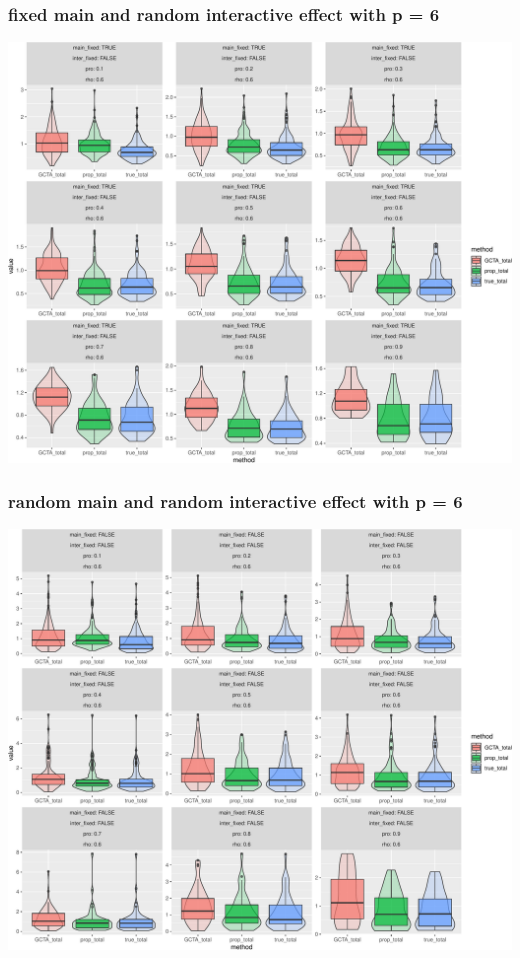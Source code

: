 \documentclass[]{article}
\begin{document}
\subsubsection{fixed main and random interactive effect with p =
6}\label{fixed-main-and-random-interactive-effect-with-p-6}

\includegraphics{Simulation_report_chi_resamle_files/figure-latex/fixed random p 6-1.pdf}

\subsubsection{random main and random interactive effect with p =
6}\label{random-main-and-random-interactive-effect-with-p-6}

\includegraphics{Simulation_report_chi_resamle_files/figure-latex/random random p 6-1.pdf}
\end{document}
